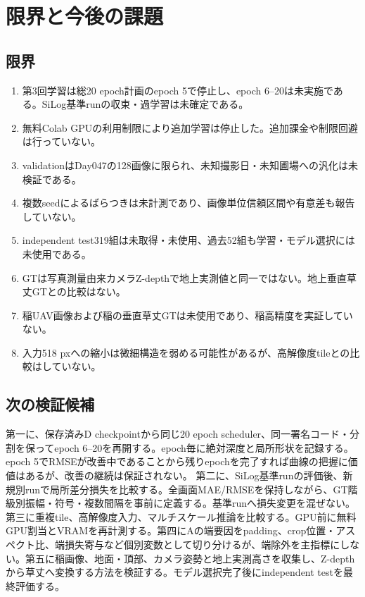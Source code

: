 \chapter{限界と今後の課題}
\section{限界}
\begin{enumerate}[leftmargin=2em]
\item 第3回学習は総20 epoch計画のepoch 5で停止し、epoch 6--20は未実施である。SiLog基準runの収束・過学習は未確定である。
\item 無料Colab GPUの利用制限により追加学習は停止した。追加課金や制限回避は行っていない。
\item validationはDay047の128画像に限られ、未知撮影日・未知圃場への汎化は未検証である。
\item 複数seedによるばらつきは未計測であり、画像単位信頼区間や有意差も報告していない。
\item independent test319組は未取得・未使用、過去52組も学習・モデル選択には未使用である。
\item GTは写真測量由来カメラZ-depthで地上実測値と同一ではない。地上垂直草丈GTとの比較はない。
\item 稲UAV画像および稲の垂直草丈GTは未使用であり、稲高精度を実証していない。
\item 入力518 pxへの縮小は微細構造を弱める可能性があるが、高解像度tileとの比較はしていない。
\end{enumerate}
\section{次の検証候補}
第一に、保存済みD checkpointから同じ20 epoch scheduler、同一署名コード・分割を保ってepoch 6--20を再開する。epoch毎に絶対深度と局所形状を記録する。epoch 5でRMSEが改善中であることから残りepochを完了すれば曲線の把握に価値はあるが、改善の継続は保証されない。
第二に、SiLog基準runの評価後、新規別runで局所差分損失を比較する。全画面MAE/RMSEを保持しながら、GT階級別振幅・符号・複数間隔を事前に定義する。基準runへ損失変更を混ぜない。第三に重複tile、高解像度入力、マルチスケール推論を比較する。GPU前に無料GPU割当とVRAMを再計測する。第四にAの端要因をpadding、crop位置・アスペクト比、端損失寄与など個別変数として切り分けるが、端除外を主指標にしない。第五に稲画像、地面・頂部、カメラ姿勢と地上実測高さを収集し、Z-depthから草丈へ変換する方法を検証する。モデル選択完了後にindependent testを最終評価する。